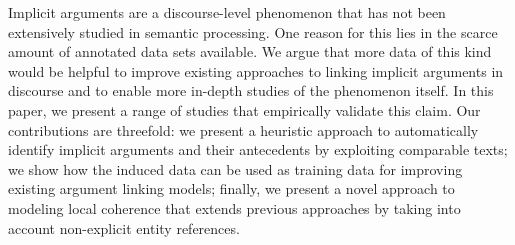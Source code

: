 Implicit arguments are a discourse-level phenomenon that has not been extensively studied in semantic processing. One reason for this lies in the
 scarce amount of annotated data sets available. We argue that more data of this
 kind would be helpful to improve existing approaches to linking implicit
 arguments in discourse and to enable more in-depth studies of the phenomenon
 itself. In this paper, we present a range of studies that empirically validate
 this claim. Our contributions are threefold: we present a heuristic approach to
 automatically identify implicit arguments and their antecedents by exploiting
 comparable texts; we show how the induced data can be used as training data for
 improving existing argument linking models; finally, we present a novel
 approach to modeling local coherence that extends previous approaches by taking
 into account non-explicit entity references.

